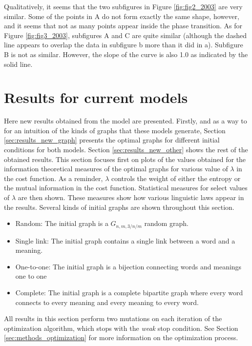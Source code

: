 Qualitatively, it seems that the two subfigures in Figure \ref{fig:fig2_2003} are very similar.
Some of the points in A do not form exactly the same shape, however, and it seems that not as many points appear inside the phase transition.
As for Figure \ref{fig:fig3_2003}, subfigures A and C are quite similar (although the dashed line appears to overlap the data in subfigure b more than it did in a).
Subfigure B is not as similar.
However, the slope of the curve is also 1.0 as indicated by the solid line.


\section{Results for current models}
\label{sec:results_new}

Here new results obtained from the model are presented.
Firstly, and as a way to for an intuition of the kinds of graphs that these models generate, Section \ref{sec:results_new_graph} presents the optimal graphs for different initial conditions for both models.
Section \ref{sec:results_new_other} shows the rest of the obtained results.
This section focuses first on plots of the values obtained for the information theoretical measures of the optimal graphs for various value of $\lambda$ in the cost function.
As a reminder, $\lambda$ controls the weight of either the entropy or the mutual information in the cost function.
Statistical measures for select values of $\lambda$ are then shown.
These measures show how various linguistic laws appear in the results.
Several kinds of initial graphs are shown throughout this section.

\begin{itemize}
\item Random: The initial graph is a $G_{n,m,3/n/m}$ random graph.
\item Single link: The initial graph contains a single link between a word and a meaning.
\item One-to-one: The initial graph is a bijection connecting words and meanings one to one
\item Complete: The initial graph is a complete bipartite graph where every word connects to every meaning and every meaning to every word.
\end{itemize}

All results in this section perform two mutations on each iteration of the optimization algorithm, which stops with the \emph{weak} stop condition.
See Section \ref{sec:methods_optimization} for more information on the optimization process.

